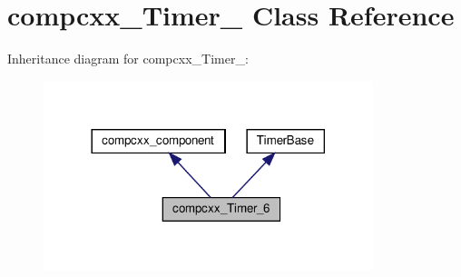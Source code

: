 \hypertarget{classcompcxx__Timer__6}{}\section{compcxx\+\_\+\+Timer\+\_ Class Reference}
\label{classcompcxx__Timer__6}


Inheritance diagram for compcxx\+\_\+\+Timer\+\_\+:\nopagebreak
\begin{figure}[H]
\begin{center}
\leavevmode
\includegraphics[width=272pt]{classcompcxx__Timer__6__inherit__graph}
\end{center}
\end{figure}


